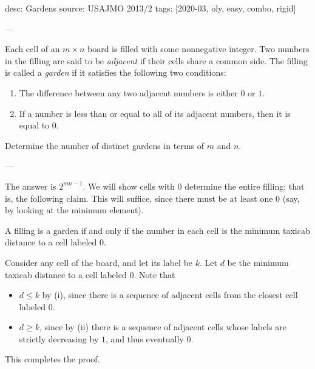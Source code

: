 desc: Gardens
source: USAJMO 2013/2
tags: [2020-03, oly, easy, combo, rigid]

---

Each cell of an $m\times n$ board is filled with some nonnegative integer. Two numbers in the filling are said to be \emph{adjacent} if their cells share a common side. The filling is called a \emph{garden} if it satisfies the following two conditions:
\begin{enumerate}[label=(\roman*),itemsep=0em]
    \item The difference between any two adjacent numbers is either $0$ or $1$.
    \item If a number is less than or equal to all of its adjacent numbers, then it is equal to $0$.
\end{enumerate}
Determine the number of distinct gardens in terms of $m$ and $n$.

---

The answer is $2^{mn-1}$. We will show cells with $0$ determine the entire filling; that is, the following claim. This will suffice, since there must be at least one $0$ (say, by looking at the minimum element).
\begin{claim*}
    A filling is a garden if and only if the number in each cell is the minimum taxicab distance to a cell labeled $0$.
\end{claim*}
Consider any cell of the board, and let its label be $k$. Let $d$ be the minimum taxicab distance to a cell labeled $0$. Note that
\begin{itemize}
    \item $d\le k$ by (i), since there is a sequence of adjacent cells from the closest cell labeled $0$.
    \item $d\ge k$, since by (ii) there is a sequence of adjacent cells whose labels are strictly decreasing by $1$, and thus eventually $0$.
\end{itemize}
This completes the proof.

